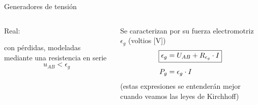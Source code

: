 \documentclass[aspectratio=169, xcolor={usenames,svgnames,dvipsnames}]{beamer}
\begin{document}
\begin{frame}{Generadores de tensión}
\begin{columns}[T]
\begin{column}{0.38\columnwidth}
\begin{center}
        \vspace{2mm}        
        \alert{Real}: 
        
        con pérdidas, modeladas mediante una resistencia \alert{en serie}
        \vspace{-2mm}
        \begin{equation*}
            u_{AB}<\epsilon_g
        \end{equation*}
        \end{center}
    \end{column}
    \begin{column}{0.21\columnwidth}

        \vspace{10mm}Se caracterizan por su \alert{fuerza
        electromotriz} $\epsilon_g$ (voltios [V])
        \begin{align*}
            \Aboxed{\epsilon_g&=U_{AB}+R_{\epsilon_g}\cdot I}\\[4pt]
            P_g&=\epsilon_g\cdot I
        \end{align*}
        \footnotesize{(estas expresiones se entenderán mejor cuando veamos las leyes de Kirchhoff)}
    \end{column}
    \end{columns}
\end{frame}

\end{document}
